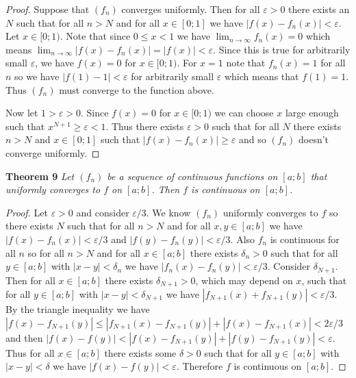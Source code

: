 \documentclass{article}
\begin{document}
\begin{flushleft}
\begin{proof}
Suppose that $(f_n)$ converges uniformly. Then for all $\varepsilon > 0$ there exists an $N$ such that for all $n>N$ and for all $x \in [0;1]$ we have $|f(x)-f_n(x)| < \varepsilon$. Let $x \in [0;1)$. Note that since $0 \leq x < 1$ we have $\lim_{n \rightarrow \infty} f_n(x) = 0$ which means $\lim_{n \rightarrow \infty} |f(x) - f_n(x)| = |f(x)| < \varepsilon$. Since this is true for arbitrarily small $\varepsilon$, we have $f(x) = 0$ for $x \in [0;1)$. For $x = 1$ note that $f_n(x) = 1$ for all $n$ so we have $|f(1) - 1| < \varepsilon$ for arbitrarily small $\varepsilon$ which means that $f(1) = 1$. Thus $(f_n)$ must converge to the function above.\newline

Now let $1 > \varepsilon > 0$. Since $f(x) = 0$ for $x \in [0;1)$ we can choose $x$ large enough such that $x^{N+1} \geq \varepsilon < 1$. Thus there exists $\varepsilon > 0$ such that for all $N$ there exists $n>N$ and $x \in [0;1]$ such that $|f(x) - f_n(x)| \geq \varepsilon$ and so $(f_n)$ doesn't converge uniformly.
\end{proof}

\textbf{Theorem 9}
\textsl{Let $(f_n)$ be a sequence of continuous functions on $[a;b]$ that uniformly converges to $f$ on $[a;b]$. Then $f$ is continuous on $[a;b]$.}
\begin{proof}
Let $\varepsilon > 0$ and consider $\varepsilon/3$. We know $(f_n)$ uniformly converges to $f$ so there exists $N$ such that for all $n>N$ and for all $x,y \in [a;b]$ we have $|f(x)-f_n(x)| < \varepsilon/3$ and $|f(y)-f_n(y)| < \varepsilon/3$. Also $f_n$ is continuous for all $n$ so for all $n>N$ and for all $x \in [a;b]$ there exists $\delta_n > 0$ such that for all $y \in [a;b]$ with $|x-y| < \delta_n$ we have $|f_n(x) - f_n(y)| < \varepsilon/3$. Consider $\delta_{N+1}$. Then for all $x \in [a;b]$ there exists $\delta_{N+1} > 0$, which may depend on $x$, such that for all $y \in [a;b]$ with $|x-y| < \delta_{N+1}$ we have $|f_{N+1}(x)+f_{N+1}(y)| < \varepsilon/3$. By the triangle inequality we have $|f(x)-f_{N+1}(y)| \leq |f_{N+1}(x)-f_{N+1}(y)| + |f(x)-f_{N+1}(x)| < 2\varepsilon/3$ and then $|f(x)-f(y)| < |f(x)-f_{N+1}(y)| + |f(y)-f_{N+1}(y)| < \varepsilon$. Thus for all $x \in [a;b]$ there exists some $\delta > 0$ such that for all $y \in [a;b]$ with $|x-y| < \delta$ we have $|f(x)-f(y)| < \varepsilon$. Therefore $f$ is continuous on $[a;b]$.
\end{proof}

\end{flushleft}
\end{document}
